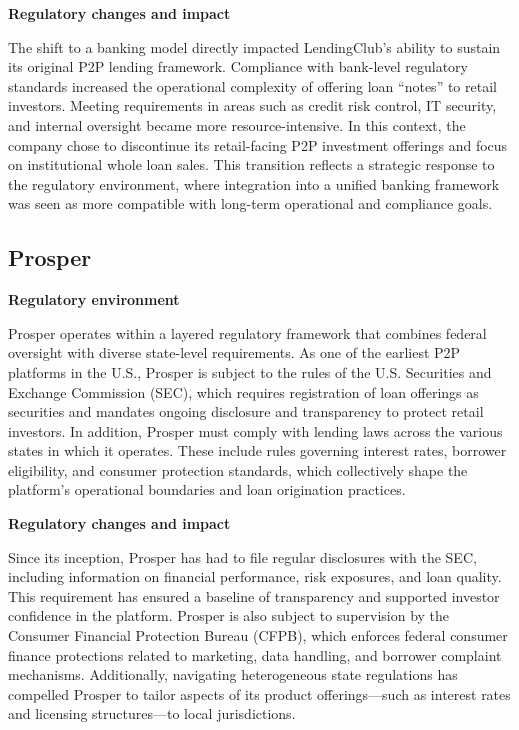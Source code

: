 \documentclass[pdflatex,sn-apa]{sn-jnl}%
\theoremstyle{thmstyleone}%
\theoremstyle{thmstyletwo}%
\theoremstyle{thmstylethree}%
\begin{document}
\textbf{Regulatory changes and impact}

The shift to a banking model directly impacted LendingClub’s ability to sustain its original P2P lending framework. Compliance with bank-level regulatory standards increased the operational complexity of offering loan “notes” to retail investors. Meeting requirements in areas such as credit risk control, IT security, and internal oversight became more resource-intensive. In this context, the company chose to discontinue its retail-facing P2P investment offerings and focus on institutional whole loan sales. This transition reflects a strategic response to the regulatory environment, where integration into a unified banking framework was seen as more compatible with long-term operational and compliance goals.

\subsection{Prosper}

\textbf{Regulatory environment}

Prosper operates within a layered regulatory framework that combines federal oversight with diverse state-level requirements. As one of the earliest P2P platforms in the U.S., Prosper is subject to the rules of the U.S. Securities and Exchange Commission (SEC), which requires registration of loan offerings as securities and mandates ongoing disclosure and transparency to protect retail investors. In addition, Prosper must comply with lending laws across the various states in which it operates. These include rules governing interest rates, borrower eligibility, and consumer protection standards, which collectively shape the platform’s operational boundaries and loan origination practices.

\textbf{Regulatory changes and impact}

Since its inception, Prosper has had to file regular disclosures with the SEC, including information on financial performance, risk exposures, and loan quality. This requirement has ensured a baseline of transparency and supported investor confidence in the platform. Prosper is also subject to supervision by the Consumer Financial Protection Bureau (CFPB), which enforces federal consumer finance protections related to marketing, data handling, and borrower complaint mechanisms. Additionally, navigating heterogeneous state regulations has compelled Prosper to tailor aspects of its product offerings—such as interest rates and licensing structures—to local jurisdictions.
\end{document}

